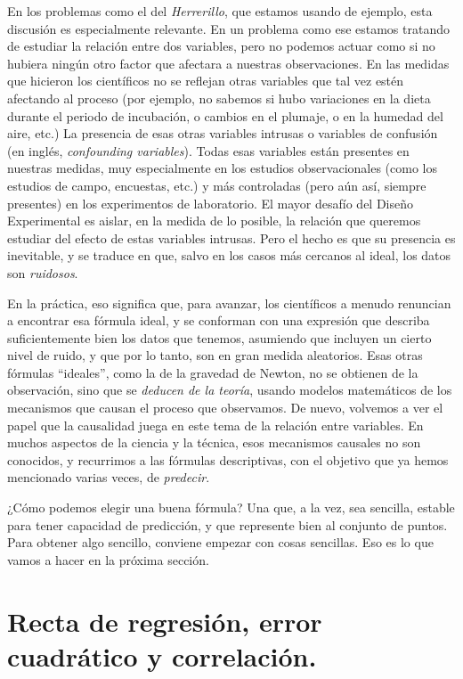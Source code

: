 En los problemas como el del {\em Herrerillo}, que estamos usando de ejemplo, esta discusión es especialmente relevante. En un problema como ese estamos tratando de estudiar la relación entre dos variables, pero no podemos actuar como si no hubiera ningún otro factor que afectara a nuestras observaciones. En las medidas que hicieron los científicos no se reflejan otras variables que tal vez estén afectando al proceso (por ejemplo, no sabemos si hubo variaciones en la dieta durante el periodo de incubación, o cambios en el plumaje, o en la humedad del aire, etc.) La presencia de esas otras {\sf variables intrusas} o {\sf variables de confusión} (en inglés, {\em confounding variables}). Todas esas variables están presentes en nuestras medidas, muy especialmente en los estudios observacionales (como los estudios de campo, encuestas, etc.) y más controladas (pero aún así, siempre presentes) en los experimentos de laboratorio. El mayor desafío del Diseño Experimental es aislar, en la medida de lo posible, la relación que queremos estudiar del efecto de estas variables intrusas. Pero el hecho es que su presencia es inevitable, y se traduce en que, salvo en los casos más cercanos al ideal, los datos son {\em ruidosos}.

En la práctica, eso significa que, para avanzar, los científicos a menudo renuncian a encontrar esa fórmula ideal, y se conforman con una expresión que describa suficientemente bien los datos que tenemos, asumiendo que incluyen un cierto nivel de ruido, y que por lo tanto, son en gran medida aleatorios. Esas otras fórmulas ``ideales'', como la de la gravedad de Newton, no se obtienen de la observación, sino que se {\em deducen de la teoría}, usando modelos matemáticos de los mecanismos que causan el proceso que observamos. De nuevo, volvemos a ver el papel que la causalidad juega en este tema de la relación entre variables. En muchos aspectos de la ciencia y la técnica, esos mecanismos causales no son conocidos, y recurrimos a las fórmulas descriptivas, con el objetivo que ya hemos mencionado varias veces, de {\em predecir}.

¿Cómo podemos elegir una buena fórmula? Una que, a la vez, sea sencilla, estable para tener capacidad de predicción, y que represente bien al conjunto de puntos. Para obtener algo sencillo, conviene empezar con cosas sencillas. Eso es lo que vamos a hacer en la próxima sección.

\section{Recta de regresión, error cuadrático y correlación.}
\label{cap10:sec:RectaRegresionECCorrelacion}

